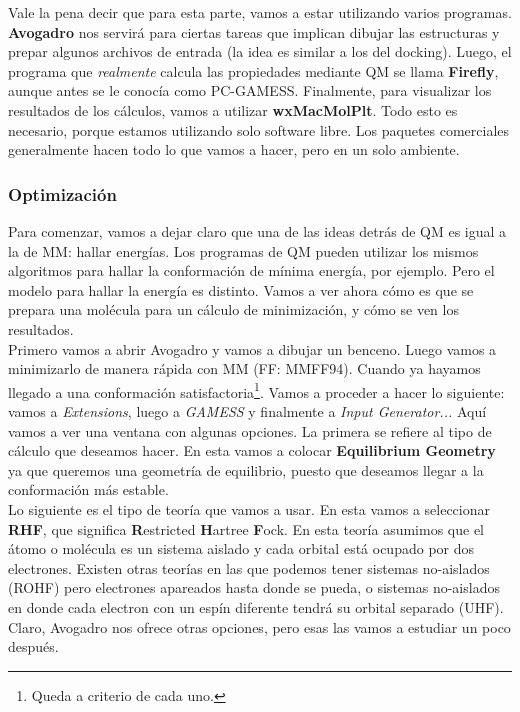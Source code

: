 \documentclass[10pt,letterpaper]{article}
\begin{document}
Vale la pena decir que para esta parte, vamos a estar utilizando varios programas. \textbf{Avogadro} nos servir\'a para ciertas tareas que implican dibujar las estructuras y prepar algunos archivos de entrada (la idea es similar a los del docking). Luego, el programa que \emph{realmente} calcula las propiedades mediante QM se llama \textbf{Firefly}, aunque antes se le conoc\'ia como PC-GAMESS. Finalmente, para visualizar los resultados de los c\'alculos, vamos a utilizar \textbf{wxMacMolPlt}. Todo esto es necesario, porque estamos utilizando solo software libre. Los paquetes comerciales generalmente hacen todo lo que vamos a hacer, pero en un solo ambiente.

\subsubsection{Optimizaci\'on}
Para comenzar, vamos a dejar claro que una de las ideas detr\'as de QM es igual a la de MM: hallar energ\'ias. Los programas de QM pueden utilizar los mismos algoritmos para hallar la conformaci\'on de m\'inima energ\'ia, por ejemplo. Pero el modelo para hallar la energ\'ia es distinto. Vamos a ver ahora c\'omo es que se prepara una mol\'ecula para un c\'alculo de minimizaci\'on, y c\'omo se ven los resultados.\\

Primero vamos a abrir Avogadro y vamos a dibujar un benceno. Luego vamos a minimizarlo de manera r\'apida con MM (FF: MMFF94). Cuando ya hayamos llegado a una conformaci\'on satisfactoria\footnote{Queda a criterio de cada uno.}. Vamos a proceder a hacer lo siguiente: vamos a \emph{Extensions}, luego a \emph{GAMESS} y finalmente a \emph{Input Generator...} Aqu\'i vamos a ver una ventana con algunas opciones. La primera se refiere al tipo de c\'alculo que deseamos hacer. En esta vamos a colocar \textbf{Equilibrium Geometry} ya que queremos una geometr\'ia de equilibrio, puesto que deseamos llegar a la conformaci\'on m\'as estable.\\

Lo siguiente es el tipo de teor\'ia que vamos a usar. En esta vamos a seleccionar \textbf{RHF}, que significa \textbf{R}estricted \textbf{H}artree \textbf{F}ock. En esta teor\'ia asumimos que el \'atomo o mol\'ecula es un sistema aislado y cada orbital est\'a ocupado por dos electrones. Existen otras teor\'ias en las que podemos tener sistemas no-aislados (ROHF) pero electrones apareados hasta donde se pueda, o sistemas no-aislados en donde cada electron con un esp\'in diferente tendr\'a su orbital separado (UHF). Claro, Avogadro nos ofrece otras opciones, pero esas las vamos a estudiar un poco despu\'es.\\
\end{document}
